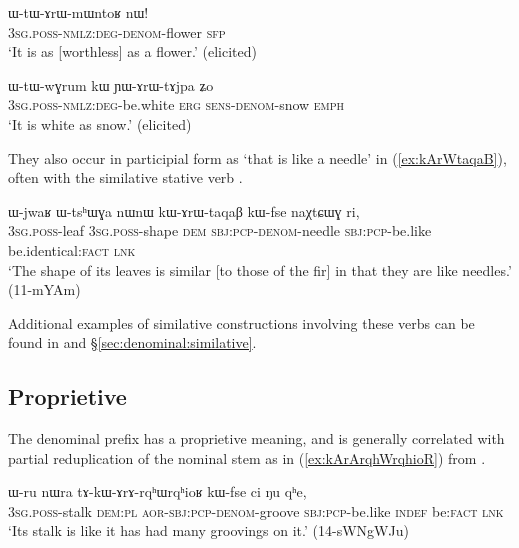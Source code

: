 \begin{exe}
\ex \label{ex:WtArWmWntoR}
\gll ɯ-tɯ-ɤrɯ-mɯntoʁ nɯ! \\
\textsc{3sg}.\textsc{poss}-\textsc{nmlz}:\textsc{deg}-\textsc{denom}-flower \textsc{sfp} \\
\glt `It is as [worthless] as a flower.' (elicited)
\end{exe}

 \begin{exe}
\ex \label{ex:YArWtAjpa}
\gll ɯ-tɯ-wɣrum kɯ ɲɯ-ɤrɯ-tɤjpa ʑo \\
\textsc{3sg}.\textsc{poss}-\textsc{nmlz}:\textsc{deg}-be.white \textsc{erg} \textsc{sens}-\textsc{denom}-snow \textsc{emph} \\
\glt `It is white as snow.' (elicited)
\end{exe}

They also occur in participial form as  `that is like a needle' in (\ref{ex:kArWtaqaB}), often with the similative stative verb .

\begin{exe}
\ex \label{ex:kArWtaqaB}
\gll ɯ-jwaʁ ɯ-tsʰɯɣa nɯnɯ kɯ-ɤrɯ-taqaβ kɯ-fse naχtɕɯɣ ri, \\
\textsc{3sg}.\textsc{poss}-leaf \textsc{3sg}.\textsc{poss}-shape \textsc{dem} \textsc{sbj}:\textsc{pcp}-\textsc{denom}-needle \textsc{sbj}:\textsc{pcp}-be.like be.identical:\textsc{fact} \textsc{lnk} \\
\glt `The shape of its leaves is similar [to those of the fir] in that they are like needles.' (11-mYAm) 
\end{exe}

Additional examples of similative constructions involving these verbs can be found in  \citet{jacques18similative} and §\ref{sec:denominal:similative}.

\subsection{Proprietive  }  \label{sec:denom.arA}
The  denominal prefix has a proprietive meaning, and is generally correlated with partial reduplication of the nominal stem as in  (\ref{ex:kArArqhWrqhioR}) from .


\begin{exe}
\ex \label{ex:kArArqhWrqhioR}
\gll ɯ-ru nɯra tɤ-kɯ-ɤrɤ-rqʰɯ\redp{}rqʰioʁ kɯ-fse ci ŋu qʰe, \\
\textsc{3sg}.\textsc{poss}-stalk \textsc{dem}:\textsc{pl} \textsc{aor}-\textsc{sbj}:\textsc{pcp}-\textsc{denom}-groove \textsc{sbj}:\textsc{pcp}-be.like \textsc{indef} be:\textsc{fact} \textsc{lnk} \\
\glt `Its stalk is like it has had many groovings on it.' (14-sWNgWJu) 
\end{exe}

